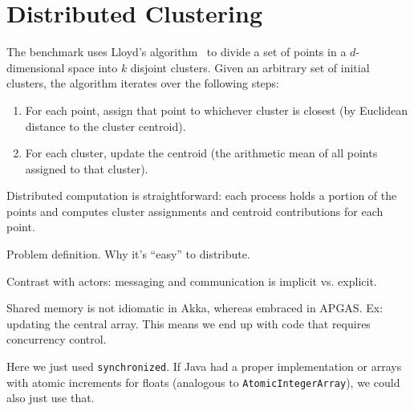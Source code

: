 \section{Distributed \kmeans Clustering}
\label{sec:kmeans}

The \kmeans benchmark uses Lloyd's algorithm~\cite{Lloyd1982Least} to divide a set of points in a $d$-dimensional space into $k$ disjoint clusters.
Given an arbitrary set of initial clusters, the algorithm iterates over the following steps:
\begin{enumerate}
  \item For each point, assign that point to whichever cluster is closest (by Euclidean distance to the cluster centroid).
  \item For each cluster, update the centroid (the arithmetic mean of all points assigned to that cluster).
\end{enumerate}

Distributed computation is straightforward: each process holds a portion of the points and computes cluster assignments and centroid contributions for each point. 

Problem definition. Why it's ``easy'' to distribute.

Contrast with actors: messaging and communication is implicit vs. explicit.

Shared memory is not idiomatic in Akka, whereas embraced in APGAS. Ex: updating
the central array. This means we end up with code that requires concurrency
control.

Here we just used \lstinline{synchronized}. If Java had a proper
implementation or arrays with atomic increments for floats (analogous to
\lstinline{AtomicIntegerArray}), we could also just use that.
